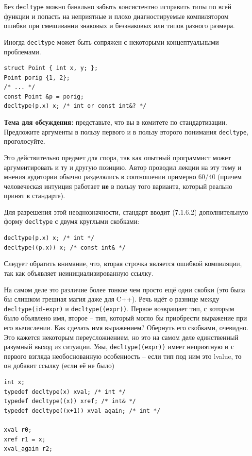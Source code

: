 \documentclass[a4paper,12pt,oneside]{article}
\begin{document}
Без \lstinline!decltype! можно банально забыть консистентно исправить типы по всей функции и попасть на неприятные и плохо диагностируемые компилятором ошибки при смешивании знаковых и беззнаковых или типов разного размера.

Иногда \lstinline!decltype! может быть сопряжен с некоторыми концептуальными проблемами.

\begin{lstlisting}
struct Point { int x, y; };
Point porig {1, 2};
/* ... */
const Point &p = porig;
decltype(p.x) x; /* int or const int&? */
\end{lstlisting}

\textbf{Тема для обсуждения:} представьте, что вы в комитете по стандартизации. Предложите аргументы в пользу первого и в пользу второго понимания \lstinline!decltype!, проголосуйте.

Это действительно предмет для спора, так как опытный программист может аргументировать и ту и другую позицию. Автор проводил лекции на эту тему и мнения аудитории обычно разделялись в соотношении примерно 60/40 (причем человеческая интуиция работает \textbf{не} в пользу того варианта, который реально принят в стандарте).

Для разрешения этой неоднозначности, стандарт вводит (7.1.6.2) дополнительную форму \lstinline!decltype! с двумя круглыми скобками:

\begin{lstlisting}
decltype(p.x) x; /* int */
decltype((p.x)) x; /* const int& */
\end{lstlisting}

Следует обратить внимание, что, вторая строчка является ошибкой компиляции, так как объявляет неинициализированную ссылку.

На самом деле это различие более тонкое чем просто ещё одни скобки (это была бы слишком грешная магия даже для C++). Речь идёт о разнице между \lstinline!decltype(id-expr)! и \lstinline!decltype((expr))!. Первое возвращает тип, с которым было объявлено имя, второе -- тип, который могло бы приобрести выражение при его вычислении. Как сделать имя выражением? Обернуть его скобками, очевидно. Это кажется некоторым переусложнением, но это на самом деле единственный разумный выход из ситуации. Увы, \lstinline!decltype((expr))! имеет неприятную и с первого взгляда необоснованную особенность -- если тип под ним это lvalue, то он добавит ссылку (если её не было)

\begin{lstlisting}
int x;
typedef decltype(x) xval; /* int */
typedef decltype((x)) xref; /* int& */
typedef decltype((x+1)) xval_again; /* int */

xval r0;
xref r1 = x;
xval_again r2;
\end{lstlisting}
\end{document}
